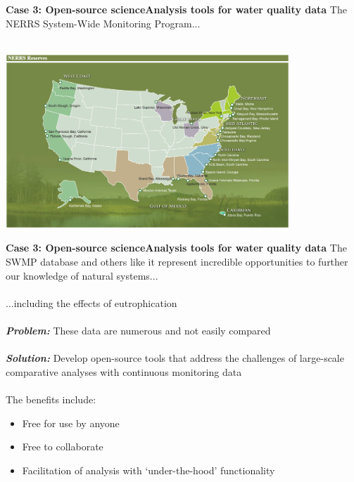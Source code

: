 \documentclass[serif]{beamer}\usepackage[]{graphicx}\usepackage[]{color}
\newcommand{\emtxt}[1]{\textbf{\textit{#1}}}
\begin{document}
\begin{frame}{\textbf{Case 3: Open-source science}}{\textbf{Analysis tools for water quality data}}
The NERRS System-Wide Monitoring Program...\\~\\
\centerline{\includegraphics[width = 0.8\textwidth]{fig/NERRS_locations.png}}
\end{frame}

\begin{frame}{\textbf{Case 3: Open-source science}}{\textbf{Analysis tools for water quality data}}
\onslide<+->
The SWMP database and others like it represent incredible opportunities to further our knowledge of natural systems...\\~\\
...including the effects of eutrophication \\~\\
\onslide<+->
\emtxt{Problem:} These data are numerous and not easily compared\\~\\
\emtxt{Solution:} Develop open-source tools that address the challenges of large-scale comparative analyses with continuous monitoring data\\~\\
\onslide<+->
The benefits include:
\begin{itemize}
\item Free for use by anyone
\item Free to collaborate
\item Facilitation of analysis with `under-the-hood' functionality
\end{itemize}
\end{frame}
\end{document}
